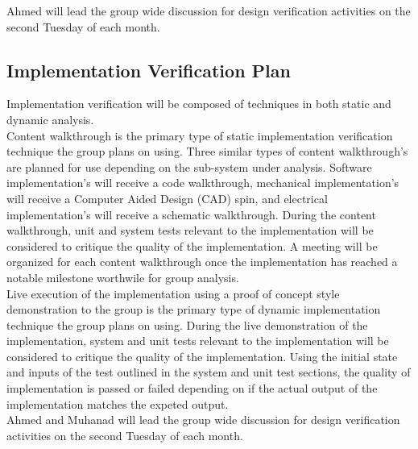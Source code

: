 \documentclass[12pt, titlepage]{article}
\begin{document}
Ahmed will lead the group wide discussion for design verification activities on the second Tuesday of each month.\newpage

\subsection{Implementation Verification Plan}



  Implementation verification will be composed of techniques in both static and dynamic analysis. \\

  Content walkthrough is the primary type of static implementation verification technique the group plans on using. Three similar types of content walkthrough's are planned for use depending on the sub-system under analysis. Software implementation's will receive a code walkthrough, mechanical implementation's will receive a Computer Aided Design (CAD) spin, and electrical implementation's will receive a schematic walkthrough. During the content walkthrough, unit and system tests relevant to the implementation will be considered to critique the quality of the implementation. A meeting will be organized for each content walkthrough once the implementation has reached a notable milestone worthwile for group analysis.\\
  
  Live execution of the implementation using a proof of concept style demonstration to the group is the primary type of dynamic implementation technique the group plans on using. During the live demonstration of the implementation, system and unit tests relevant to the implementation will be considered to critique the quality of the implementation. Using the initial state and inputs of the test outlined in the system and unit test sections, the quality of implementation is passed or failed depending on if the actual output of the implementation matches the expeted output.\\

Ahmed and Muhanad will lead the group wide discussion for design verification activities on the second Tuesday of each month.\newpage
\end{document}

